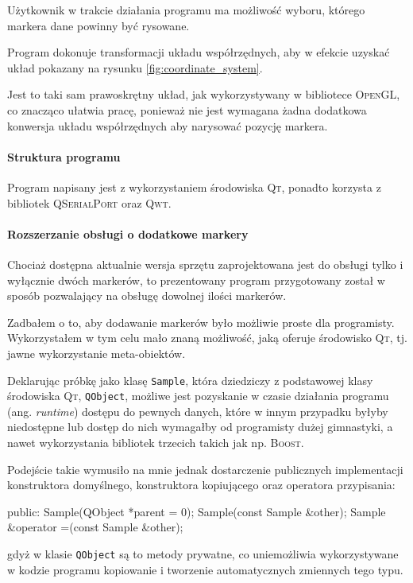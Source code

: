 Użytkownik w trakcie działania programu ma możliwość wyboru, którego markera dane powinny być rysowane.

Program dokonuje transformacji układu współrzędnych, aby w efekcie uzyskać układ pokazany na rysunku \ref{fig:coordinate_system}.

Jest to taki sam prawoskrętny układ, jak wykorzystywany w bibliotece \textsc{OpenGL}, co znacząco ułatwia pracę, ponieważ nie jest wymagana żadna dodatkowa konwersja układu współrzędnych aby narysować pozycję markera.

\paragraph{Struktura programu}
Program napisany jest z wykorzystaniem środowiska \textsc{Qt}, ponadto korzysta z bibliotek \textsc{QSerialPort} oraz \textsc{Qwt}.

\paragraph{Rozszerzanie obsługi o dodatkowe markery}
Chociaż dostępna aktualnie wersja sprzętu zaprojektowana jest do obsługi tylko i wyłącznie dwóch markerów, to prezentowany program przygotowany został w sposób pozwalający na obsługę dowolnej ilości markerów.

Zadbałem o to, aby dodawanie markerów było możliwie proste dla programisty. Wykorzystałem w tym celu mało znaną możliwość, jaką oferuje środowisko \textsc{Qt}, tj. jawne wykorzystanie meta-obiektów.

Deklarując próbkę jako klasę \verb|Sample|, która dziedziczy z podstawowej klasy środowiska \textsc{Qt}, \verb|QObject|, możliwe jest pozyskanie w czasie działania programu (ang. \textsl{runtime}) dostępu do pewnych danych, które w innym przypadku byłyby niedostępne lub dostęp do nich wymagałby od programisty dużej gimnastyki, a nawet wykorzystania bibliotek trzecich takich jak np. \textsc{Boost}.

Podejście takie wymusiło na mnie jednak dostarczenie publicznych implementacji konstruktora domyślnego, konstruktora kopiującego oraz operatora przypisania:
\begin{verbatimtab}
public:
	Sample(QObject *parent = 0);
	Sample(const Sample &other);
	Sample &operator =(const Sample &other);
\end{verbatimtab}
gdyż w klasie \verb|QObject| są to metody prywatne, co uniemożliwia wykorzystywane w kodzie programu kopiowanie i tworzenie automatycznych zmiennych tego typu.

